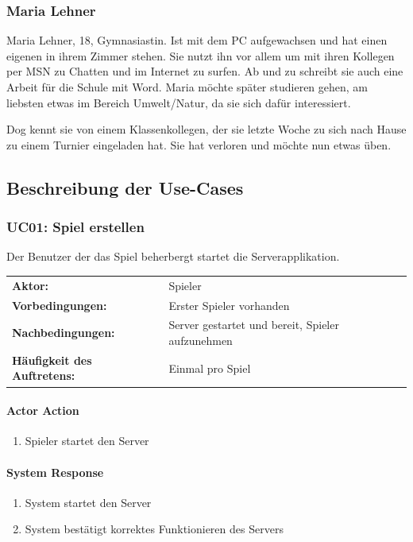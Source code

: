 \documentclass[12pt,halfparskip]{scrartcl}
\begin{document}
\subsubsection{Maria Lehner}\label{sub:maria_lehner} 

Maria Lehner, 18, Gymnasiastin. Ist mit dem PC aufgewachsen und hat einen eigenen in ihrem Zimmer stehen. Sie nutzt ihn vor allem um mit ihren Kollegen per MSN zu Chatten und im Internet zu surfen. Ab und zu schreibt sie auch eine Arbeit für die Schule mit Word. Maria möchte später studieren gehen, am liebsten etwas im Bereich Umwelt/Natur, da sie sich dafür interessiert. 

Dog kennt sie von einem Klassenkollegen, der sie letzte Woche zu sich nach Hause zu einem Turnier eingeladen hat. Sie hat verloren und möchte nun etwas üben.

\subsection{Beschreibung der Use-Cases}\label{sub:use_cases}
\subsubsection{UC01: Spiel erstellen}\label{ssub:uc01_spiel_erstellen}
Der Benutzer der das Spiel beherbergt startet die Serverapplikation.

\begin{tabular}{@{} l l @{}}
	\textbf{Aktor:}											&	Spieler \\
	\textbf{Vorbedingungen:}						& Erster Spieler vorhanden \\
	\textbf{Nachbedingungen:}						& Server gestartet und bereit, Spieler aufzunehmen \\
	\textbf{Häufigkeit des Auftretens:}	& Einmal pro Spiel \\
\end{tabular}

\vspace{0.5cm}

\begin{multicols}{2}
\raggedcolumns
\paragraph{Actor Action}
\begin{enumerate}
	\item[1] Spieler startet den Server
\end{enumerate}
\columnbreak
\paragraph{System Response}
\begin{enumerate}
	\item[2] System startet den Server
	\item[3] System bestätigt korrektes Funktionieren des Servers
\end{enumerate}
\end{multicols}
\end{document}

